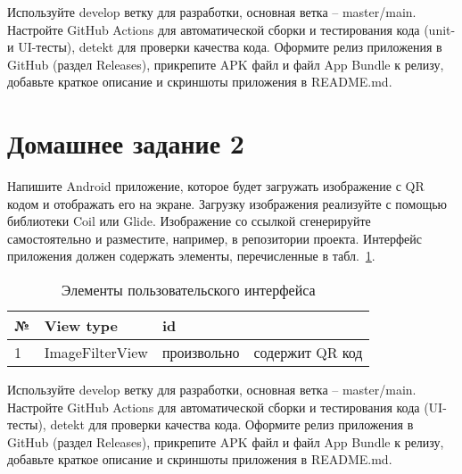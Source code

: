 \documentclass{article}
\begin{document}
Используйте develop ветку для разработки, основная ветка -- master/main. Настройте GitHub Actions для автоматической сборки и тестирования кода (unit- и UI-тесты), detekt для проверки качества кода.
Оформите релиз приложения в GitHub (раздел Releases), прикрепите APK файл и файл App Bundle к релизу, добавьте краткое описание и скриншоты приложения в README.md.

\clearpage

\section*{Домашнее задание 2}

Напишите Android приложение, которое будет загружать изображение с QR кодом и отображать его на экране. Загрузку изображения реализуйте с помощью библиотеки Coil или Glide. Изображение со ссылкой сгенерируйте самостоятельно и разместите, например, в репозитории проекта.
Интерфейс приложения должен содержать элементы, перечисленные в табл.~\ref{table:layout:ids_2}.


\begin{table}[h]
    \begin{center}
        \begin{tabularx}{\textwidth}{p{3ex} p{25ex} p{21ex} p{19ex} }
    \midrule\toprule
    № & View type           & id                  &   \\ \midrule
    1 & ImageFilterView     & произвольно         & содержит QR код  \\
\bottomrule\midrule
    \end{tabularx}
    \caption{Элементы пользовательского интерфейса}
    \label{table:layout:ids_2}
\end{center}
\end{table}



Используйте develop ветку для разработки, основная ветка -- master/main. Настройте GitHub Actions для автоматической сборки и тестирования кода (UI-тесты), detekt для проверки качества кода.
Оформите релиз приложения в GitHub (раздел Releases), прикрепите APK файл и файл App Bundle к релизу, добавьте краткое описание и скриншоты приложения в README.md.
\end{document}
